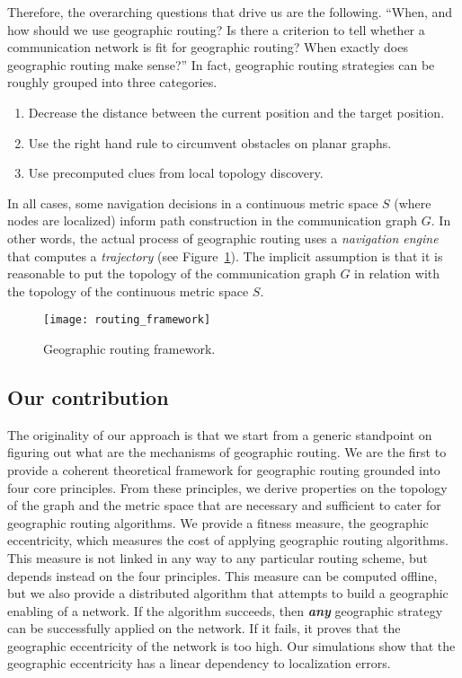 \documentclass{article}
\begin{document}
Therefore, the overarching questions that drive us are the following. ``When, and how should we use geographic routing? Is there a criterion to tell whether a communication network is fit for geographic routing? When exactly does geographic routing make sense?''
In fact, geographic routing strategies can be roughly grouped into three categories.
\begin{enumerate}
\item Decrease the distance between the current position and the target position.
\item Use the right hand rule to circumvent obstacles on planar graphs.
\item Use precomputed clues from local topology discovery.
\end{enumerate}
In all cases, some navigation decisions in a continuous metric space $S$ (where nodes are localized) inform path construction in the communication graph $G$. In other words, the actual process of geographic routing uses a {\em navigation engine} that computes a {\em trajectory} (see Figure~\ref{fig_routing}). The implicit assumption is that it is reasonable to put the topology of the communication graph $G$ in relation with the topology of the continuous metric space $S$.

\begin{figure}[h]
\begin{center}
\texttt{[image: routing\_framework]}
\caption{Geographic routing framework.}
\label{fig_routing}
\end{center}
\end{figure}

\subsection*{Our contribution}
The originality of our approach is that we start from a generic standpoint on figuring out what are the mechanisms of geographic routing. We are the first to provide a coherent theoretical framework for geographic routing grounded into four core principles. From these principles, we derive properties on the topology of the graph and the metric space that are necessary and sufficient to cater for geographic routing algorithms. We provide a fitness measure, the geographic eccentricity, which measures the cost of applying geographic routing algorithms. This measure is not linked in any way to any particular routing scheme, but depends instead on the four principles.
 This measure can be computed offline, but we also provide a distributed algorithm that attempts to build a geographic enabling of a network. If the algorithm succeeds, then {\bf \em any} geographic strategy can be successfully applied on the network. If it fails, it proves that the geographic eccentricity of the network is too high. Our simulations show that the geographic eccentricity has a linear dependency to localization errors.
\end{document}
